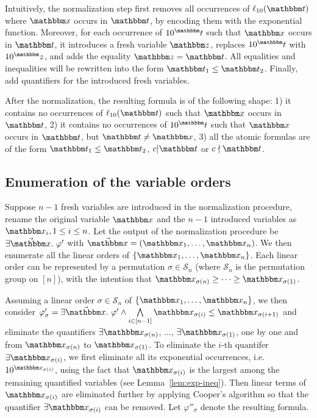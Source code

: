 Intuitively, the normalization step first removes all occurrences of $\ell_{10}(\iterm)$ where $\ivarx$ occurs in $\iterm$, by encoding them with the exponential function. Moreover, for each occurrence of $10^\iterm$ such that $\ivarx$ occurs in $\iterm$, it introduces a fresh variable $\ivarz$, replaces $10^\iterm$ with $10^\ivarz$, and adds the equality $\ivarz = \iterm$. All equalities and inequalities will be rewritten into the form $\iterm_1\le\iterm_2$. Finally, add quantifiers for the introduced fresh variables.

After the normalization, the resulting formula is of the following shape: 1) it contains no occurrences of $\ell_{10}(\iterm)$ such that $\ivarx$ occurs in $\iterm$, 2)  it contains no occurrences of $10^\iterm$ such that $\ivarx$ occurs in $\iterm$, but $\iterm \neq \ivarx$, 3) all the atomic formulas are of the form $\iterm_1 \le \iterm_2$, $c \vert  \iterm$ or $c\nmid \iterm$. 

\subsection{Enumeration of the variable orders}\label{qe-enum}

Suppose $n-1$ fresh variables are introduced in the normalization procedure, rename the original variable $\ivarx$ and the $n-1$ introduced variables as $\ivarx_i,1\le i\le n$.
Let the output of the normalization procedure be $\exists \vec{\ivarx}.\ \varphi'$ with $\vec{\ivarx} = (\ivarx_1,\ldots, \ivarx_n)$. 
We then enumerate all the linear orders of $\{\ivarx_1,\ldots, \ivarx_n\}$. Each linear order can be represented by a permutation $\sigma \in \mathcal{S}_n$ (where $\mathcal{S}_n$ is the permutation group on $[n]$), with the intention that $\ivarx_{\sigma(n)} \ge \cdots \ge \ivarx_{\sigma(1)}$.

Assuming a linear order $\sigma \in \mathcal{S}_n$ of $\{\ivarx_1,\ldots, \ivarx_n\}$, we then consider $\varphi'_\sigma  = \exists \vec{\ivarx}.\ \varphi' \wedge \bigwedge \limits_{i \in [n-1]} \ivarx_{\sigma(i)} \le \ivarx_{\sigma(i+1)}$ and eliminate the quantifiers $\exists \ivarx_{\sigma(n)}$, $\ldots$, $\exists \ivarx_{\sigma(1)}$,  one by one and from $\ivarx_{\sigma(n)}$ to $\ivarx_{\sigma(1)}$. To eliminate the $i$-th quantifer $\exists \ivarx_{\sigma(i)}$, we first eliminate all its exponential occurrences, i.e. $10^{\ivarx_{\sigma(i)}}$, using the fact that $\ivarx_{\sigma(i)}$ is the largest among the remaining quantified variables (see Lemma~\ref{lem:exp-ineq}). Then linear terms of $\ivarx_{\sigma(i)}$ are eliminated further by applying Cooper's algorithm so that the quantifier $\exists \ivarx_{\sigma(i)}$ can be removed. Let $\varphi''_\sigma$ denote the resulting formula.


